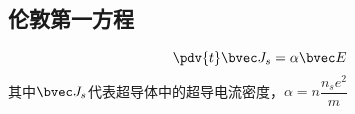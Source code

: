 \subsection{伦敦第一方程}
\begin{equation}
\pdv{t}\bvec J_s=\alpha\bvec E
\end{equation}
其中$\bvec J_s$代表超导体中的超导电流密度，$\alpha=n\dfrac {n_se^2}m$